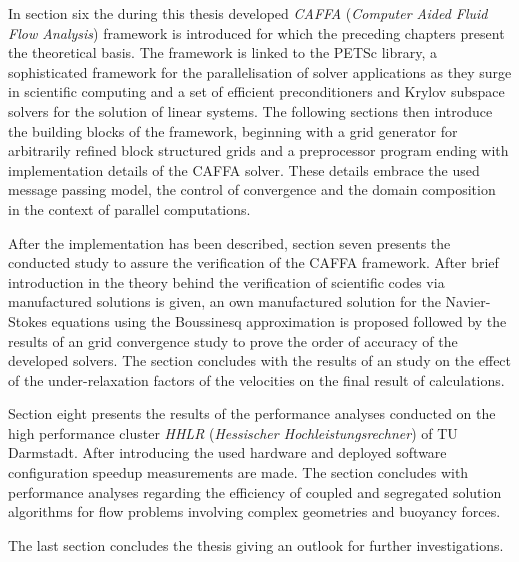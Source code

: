In section six the during this thesis developed \emph{CAFFA} (\emph{Computer Aided Fluid Flow Analysis}) framework is introduced for which the preceding chapters present the theoretical basis. The framework is linked to the PETSc library, a sophisticated framework for the parallelisation of solver applications as they surge in scientific computing and a set of efficient preconditioners and Krylov subspace solvers for the solution of linear systems. The following sections then introduce the building blocks of the framework, beginning with a grid generator for arbitrarily refined block structured grids and a preprocessor program ending with implementation details of the CAFFA solver. These details embrace the used message passing model, the control of convergence and the domain composition in the context of parallel computations.

After the implementation has been described, section seven presents the conducted study to assure the verification of the CAFFA framework. After brief introduction in the theory behind the verification of scientific codes via manufactured solutions is given, an own manufactured solution for the Navier-Stokes equations using the Boussinesq approximation is proposed followed by the results of an grid convergence study to prove the order of accuracy of the developed solvers. The section concludes with the results of an study on the effect of the under-relaxation factors of the velocities on the final result of calculations.

Section eight presents the results of the performance analyses conducted on the high performance cluster \emph{HHLR} (\emph{Hessischer Hochleistungsrechner}) of TU Darmstadt. After introducing the used hardware and deployed software configuration speedup measurements are made. The section concludes with performance analyses regarding the efficiency of coupled and segregated solution algorithms for flow problems involving complex geometries and buoyancy forces.

The last section concludes the thesis giving an outlook for further investigations.

